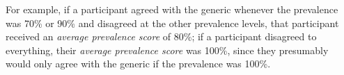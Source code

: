 \documentclass{pnastwo}
\begin{document}
\begin{article}
\begin{materials}
For example, if a participant agreed with the generic whenever the prevalence was 70\% or 90\% and disagreed at the other prevalence levels, that participant received an \emph{average prevalence score} of 80\%; if a participant disagreed to everything, their \emph{average prevalence score} was 100\%, since they presumably would only agree with the generic if the prevalence was 100\%.
%


\end{materials}
\end{article}
\end{document}
